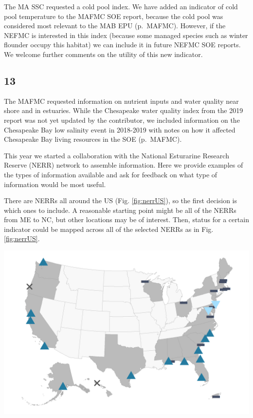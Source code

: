 \documentclass[
  10pt,
]{article}
\let\origfigure\figure
\let\endorigfigure\endfigure
\renewenvironment{figure}[1][2] {
    \expandafter\origfigure\expandafter[H]
} {
    \endorigfigure
}
\begin{document}
The MA SSC requested a cold pool index. We have added an indicator of
cold pool temperature to the MAFMC SOE report, because the cold pool was
considered most relevant to the MAB EPU (p.~MAFMC). However, if the
NEFMC is interested in this index (because some managed species such as
winter flounder occupy this habitat) we can include it in future NEFMC
SOE reports. We welcome further comments on the utility of this new
indicator.

\hypertarget{section-12}{%
\subsection{13}\label{section-12}}

The MAFMC requested information on nutrient inputs and water quality
near shore and in estuaries. While the Chesapeake water quality index
from the 2019 report was not yet updated by the contributor, we included
information on the Chesapeake Bay low salinity event in 2018-2019 with
notes on how it affected Chesapeake Bay living resources in the SOE
(p.~MAFMC).

This year we started a collaboration with the National Esturarine
Research Reserve (NERR) network to assemble information. Here we provide
examples of the types of information available and ask for feedback on
what type of information would be most useful.

There are NERRs all around the US (Fig. \ref{fig:nerrUS}), so the first
decision is which ones to include. A reasonable starting point might be
all of the NERRs from ME to NC, but other locations may be of interest.
Then, status for a certain indicator could be mapped across all of the
selected NERRs as in Fig. \ref{fig:nerrUS}.

\begin{figure}

{\centering \includegraphics[width=25in]{images/nerrs_map} 

}

\caption{National Estuarine Research Reserve locations in the US.}\label{fig:nerrUS}
\end{figure}
\end{document}
